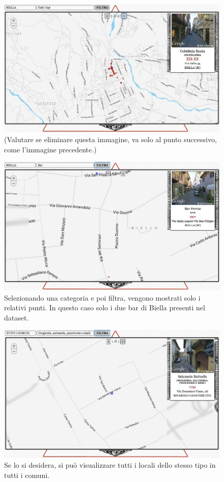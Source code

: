 \begin{figure}[ht!]
	\caption{(Valutare se eliminare questa immagine, va solo al punto successivo, come l'immagine precedente.)}
	\centering
		\includegraphics[width=\textwidth]{img/s7.jpg}
\end{figure}

\begin{figure}[ht!]
	\caption{Selezionando una categoria e poi filtra, vengono mostrati solo i relativi punti. In questo caso solo i due bar di Biella presenti nel dataset.}
	\centering
		\includegraphics[width=\textwidth]{img/s8.jpg}
\end{figure}

\begin{figure}[ht!]
	\caption{Se lo si desidera, si pu\`o visualizzare tutti i locali dello stesso tipo in tutti i comuni.}
	\centering
		\includegraphics[width=\textwidth]{img/s9.jpg}
\end{figure}

